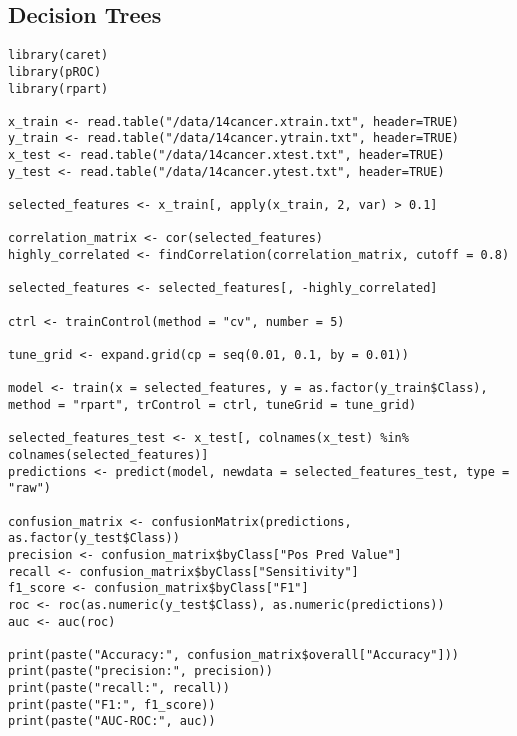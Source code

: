 \documentclass{article}
\begin{document}
\subsection{Decision Trees}
\begin{lstlisting}
library(caret)
library(pROC)
library(rpart)

x_train <- read.table("/data/14cancer.xtrain.txt", header=TRUE)
y_train <- read.table("/data/14cancer.ytrain.txt", header=TRUE)
x_test <- read.table("/data/14cancer.xtest.txt", header=TRUE)
y_test <- read.table("/data/14cancer.ytest.txt", header=TRUE)

selected_features <- x_train[, apply(x_train, 2, var) > 0.1]

correlation_matrix <- cor(selected_features)
highly_correlated <- findCorrelation(correlation_matrix, cutoff = 0.8)

selected_features <- selected_features[, -highly_correlated]

ctrl <- trainControl(method = "cv", number = 5)

tune_grid <- expand.grid(cp = seq(0.01, 0.1, by = 0.01))

model <- train(x = selected_features, y = as.factor(y_train$Class), method = "rpart", trControl = ctrl, tuneGrid = tune_grid)

selected_features_test <- x_test[, colnames(x_test) %in% colnames(selected_features)]
predictions <- predict(model, newdata = selected_features_test, type = "raw")

confusion_matrix <- confusionMatrix(predictions, as.factor(y_test$Class))
precision <- confusion_matrix$byClass["Pos Pred Value"]
recall <- confusion_matrix$byClass["Sensitivity"]
f1_score <- confusion_matrix$byClass["F1"]
roc <- roc(as.numeric(y_test$Class), as.numeric(predictions))
auc <- auc(roc)

print(paste("Accuracy:", confusion_matrix$overall["Accuracy"]))
print(paste("precision:", precision))
print(paste("recall:", recall))
print(paste("F1:", f1_score))
print(paste("AUC-ROC:", auc))
\end{lstlisting}
\newpage
\end{document}
